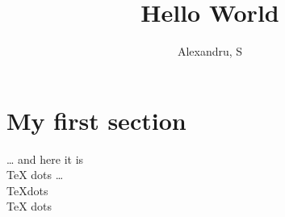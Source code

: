 \documentclass[a4paper, 11pt]{article}
\author{Alexandru, S}
\begin{document}
\title{Hello World}
\maketitle
\tableofcontents
\section{My first section}
\ldots{} and here it is \\
TeX dots \ldots{} \\
\TeX dots \\
\TeX{} dots
\end{document}
